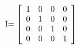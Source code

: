\[
$I$ =
\left[ {\begin{array}{cccc}
 1 & 0 & 0 & 0  \\
 0 & 1 & 0 & 0  \\
 0 & 0 & 1 & 0  \\
 0 & 0 & 0 & 1  \\
 \end{array} } \right]
\]